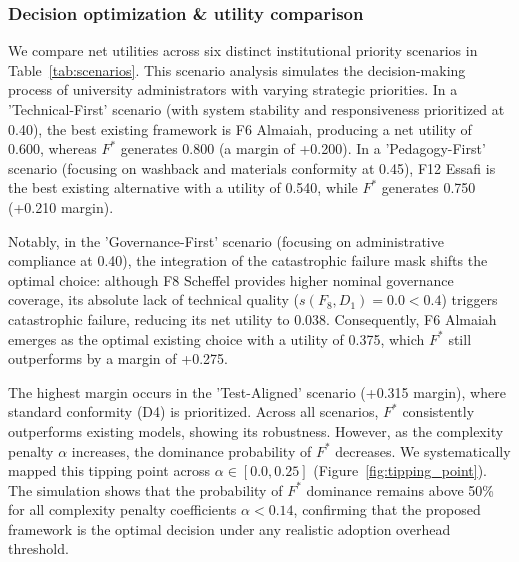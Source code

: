 \documentclass[11pt,a4paper]{article}
\begin{document}
\subsubsection{Decision optimization \& utility comparison}
We compare net utilities across six distinct institutional priority scenarios in Table~\ref{tab:scenarios}. This scenario analysis simulates the decision-making process of university administrators with varying strategic priorities. In a 'Technical-First' scenario (with system stability and responsiveness prioritized at 0.40), the best existing framework is F6 Almaiah, producing a net utility of 0.600, whereas $F^*$ generates 0.800 (a margin of +0.200). In a 'Pedagogy-First' scenario (focusing on washback and materials conformity at 0.45), F12 Essafi is the best existing alternative with a utility of 0.540, while $F^*$ generates 0.750 (+0.210 margin). 

Notably, in the 'Governance-First' scenario (focusing on administrative compliance at 0.40), the integration of the catastrophic failure mask shifts the optimal choice: although F8 Scheffel provides higher nominal governance coverage, its absolute lack of technical quality ($s(F_8, D_1) = 0.0 < 0.4$) triggers catastrophic failure, reducing its net utility to 0.038. Consequently, F6 Almaiah emerges as the optimal existing choice with a utility of 0.375, which $F^*$ still outperforms by a margin of +0.275. 

The highest margin occurs in the 'Test-Aligned' scenario (+0.315 margin), where standard conformity (D4) is prioritized. Across all scenarios, $F^*$ consistently outperforms existing models, showing its robustness. However, as the complexity penalty $\alpha$ increases, the dominance probability of $F^*$ decreases. We systematically mapped this tipping point across $\alpha \in [0.0, 0.25]$ (Figure~\ref{fig:tipping_point}). The simulation shows that the probability of $F^*$ dominance remains above 50\% for all complexity penalty coefficients $\alpha < 0.14$, confirming that the proposed framework is the optimal decision under any realistic adoption overhead threshold.
\end{document}

